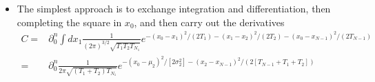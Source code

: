 \begin{itemize}
    \item The simplest approach is to exchange integration and differentiation, then completing the square in $x_0$,
    and then carry out the derivatives
    \begin{align}
      C=&\partial_0^n\int dx_1  \frac{1}{(2\pi)^{3/2}\sqrt{T_1T_2T_{N_1}}}e^{-(x_0-x_1)^2/(2T_1)-(x_1-x_2)^2/(2T_2)-(x_0-x_{N-1})^2/(2T_{N-1})}\\
      =&\partial_0^n \frac{1}{2\pi\sqrt{(T_1+T_2)T_{N_1}}}e^{-(x_0-\mu_2)^2/[2\sigma_2^2]-(x_2-x_{N-1})^2/(2[T_{N-1}+T_1+T_2])}\\

\end{align}
\end{itemize}
